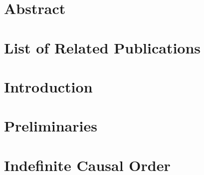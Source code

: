 \documentclass[11pt]{book}
\renewcommand{\baselinestretch}{1.2}
\begin{document}


\newpage
\thispagestyle{empty}
\renewcommand{\thesisdedication}{{\large Copyright \copyright~Sravani Yanamandra, 2024\\}{\large All Rights Reserved\\}}
\thesisdedicationpage


\mastersthesis
%
\chapter*{Abstract}
\label{ch:abstract}

%
\tableofcontents

\chapter*{List of Related Publications}
\label{ch:relatedPubs}


\chapter{Introduction}
\label{ch:intro}


\chapter{Preliminaries}
\label{ch:ch1}


\label{ch:oqs}


\chapter{Indefinite Causal Order}
\label{ch:ico}


\end{document}
